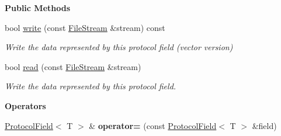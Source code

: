 \begin{Indent}\textbf{ Public Methods}\par
\begin{DoxyCompactItemize}
\item 
bool \mbox{\hyperlink{structrev_1_1_protocol_field_a39549ff49ab211a50e5f6a9cc61ecfa0}{write}} (const \mbox{\hyperlink{classrev_1_1_file_stream}{File\+Stream}} \&stream) const
\begin{DoxyCompactList}\small\item\em Write the data represented by this protocol field (vector version) \end{DoxyCompactList}\item 
bool \mbox{\hyperlink{structrev_1_1_protocol_field_adce4cb535c5fcd3aaeac1c0c0f5fda71}{read}} (const \mbox{\hyperlink{classrev_1_1_file_stream}{File\+Stream}} \&stream)
\begin{DoxyCompactList}\small\item\em Write the data represented by this protocol field. \end{DoxyCompactList}\end{DoxyCompactItemize}
\end{Indent}
\begin{Indent}\textbf{ Operators}\par
\begin{DoxyCompactItemize}
\item 
\mbox{\label{structrev_1_1_protocol_field_a9c10b88653dd6af564d3535629e74a8a}} 
\mbox{\hyperlink{structrev_1_1_protocol_field}{Protocol\+Field}}$<$ T $>$ \& {\bfseries operator=} (const \mbox{\hyperlink{structrev_1_1_protocol_field}{Protocol\+Field}}$<$ T $>$ \&field)
\end{DoxyCompactItemize}
\end{Indent}
